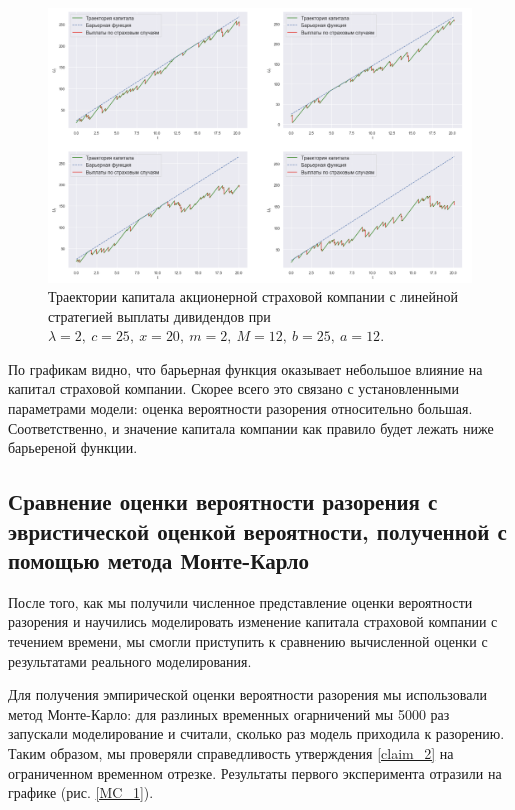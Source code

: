 \documentclass{article}
\theoremstyle{plain}
\theoremstyle{plain}
\theoremstyle{plain}
\theoremstyle{plain}
\theoremstyle{definition}
\theoremstyle{remark}
\begin{document}
\begin{figure}[h]
\centering
\includegraphics[scale=0.5]{images/KL_stock_trajectory.png}
\captionsetup{justification=centering}
\caption{Траектории капитала акционерной страховой компании с линейной стратегией выплаты дивидендов при $\lambda = 2,\ c = 25,\ x = 20,\ m = 2,\ M = 12,\ b = 25,\ a = 12$.}
\label{stock_trajectory}
\end{figure}

По графикам видно, что барьерная функция оказывает небольшое влияние на капитал страховой компании. Скорее всего это связано с установленными параметрами модели: оценка вероятности разорения относительно большая. Соответственно, и значение капитала компании как правило будет лежать ниже барьереной функции.

\subsection{Сравнение оценки вероятности разорения с эвристической оценкой вероятности, полученной с помощью метода Монте-Карло}

После того, как мы получили численное представление оценки вероятности разорения и научились моделировать изменение капитала страховой компании с течением времени, мы смогли приступить к сравнению вычисленной оценки с результатами реального моделирования.

Для получения эмпирической оценки вероятности разорения мы использовали метод Монте-Карло: для разлиных временных огарничений мы 5000 раз запускали моделирование и считали, сколько раз модель приходила к разорению. Таким образом, мы проверяли справедливость утверждения \ref{claim_2} на ограниченном временном отрезке. Результаты первого эксперимента отразили на графике (рис. \ref{MC_1}).
\end{document}
